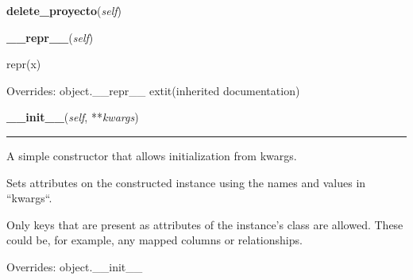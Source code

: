     \label{app:modelo:proyecto:Proyecto:delete_proyecto}

    \vspace{0.5ex}

\hspace{.8\funcindent}\begin{boxedminipage}{\funcwidth}

    \raggedright \textbf{delete\_proyecto}(\textit{self})

\setlength{\parskip}{2ex}
\setlength{\parskip}{1ex}
    \end{boxedminipage}

    \vspace{0.5ex}

\hspace{.8\funcindent}\begin{boxedminipage}{\funcwidth}

    \raggedright \textbf{\_\_repr\_\_}(\textit{self})

\setlength{\parskip}{2ex}
    repr(x)

\setlength{\parskip}{1ex}
      Overrides: object.\_\_repr\_\_ 	extit{(inherited documentation)}

    \end{boxedminipage}

    \vspace{0.5ex}

\hspace{.8\funcindent}\begin{boxedminipage}{\funcwidth}

    \raggedright \textbf{\_\_init\_\_}(\textit{self}, **\textit{kwargs})

    \vspace{-1.5ex}

    \rule{\textwidth}{0.5\fboxrule}
\setlength{\parskip}{2ex}
    A simple constructor that allows initialization from kwargs.

    Sets attributes on the constructed instance using the names and values 
    in ``kwargs``.

    Only keys that are present as attributes of the instance's class are 
    allowed. These could be, for example, any mapped columns or 
    relationships.

\setlength{\parskip}{1ex}
      Overrides: object.\_\_init\_\_

    \end{boxedminipage}


